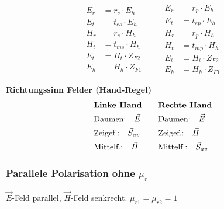 \begin{equation*}
\begin{aligned}
	E_r & = r_s \cdot E_h    \\
	E_t & = t_{es} \cdot E_h \\
	H_r & = r_s \cdot H_h    \\
	H_t & = t_{ms} \cdot H_h \\
	E_t & = H_t\cdot Z_{F2}  \\
	E_h & = H_h\cdot Z_{F1}
\end{aligned}
\qquad
\begin{aligned}
    E_r & = r_p\cdot E_h    \\
    E_t & = t_{ep}\cdot E_h \\
    H_r & = r_p\cdot H_h    \\
    H_t & = t_{mp}\cdot H_h \\
    E_t & = H_t\cdot Z_{F2} \\
    E_h & = H_h\cdot Z_{F1} 
\end{aligned}
\end{equation*}

\textbf{Richtungssinn Felder (Hand-Regel)}
\begin{equation*}
	\begin{aligned}
	& \text{\textbf{Linke Hand}}\\
	& \text{Daumen:}\quad \vec{E}\\
	& \text{Zeigef.:}\quad \vec{S}_{av}\\
	& \text{Mittelf.:}\quad \vec{H} 
	\end{aligned}
	\qquad
	\begin{aligned}
	& \text{\textbf{Rechte Hand}}\\
	& \text{Daumen:}\quad \vec{E}\\
	& \text{Zeigef.:}\quad \vec{H}\\
	& \text{Mittelf.:}\quad \vec{S}_{av}
	\end{aligned}
\end{equation*}
\newcolumn
\subsubsection{Parallele Polarisation ohne $ \mu_r $}
\begin{center}

\end{center}
$\vec{E}$-Feld parallel, $ \vec{H}$-Feld senkrecht. \qquad $ \mu_{r1} = \mu_{r2} =1 $\\

